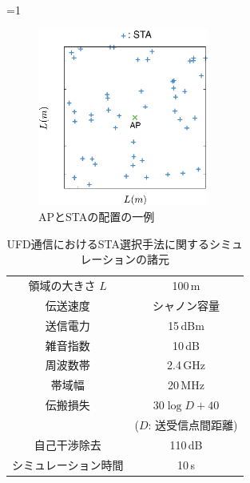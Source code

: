 \documentclass[master]{kuisthesis}		%
\newcounter{flagFig}
\begin{document}
			\ifnum\value{flagFig}=1 {\begin{figure}[t]
				\begin{center}
					\includegraphics[width=0.5\textwidth]{fig/pos.eps}
					\caption{APとSTAの配置の一例}
					\label{fig:pos}
				\end{center}
			\end{figure}}\fi

			\begin{table}[t]
				\centering
				\caption{UFD通信におけるSTA選択手法に関するシミュレーションの諸元}
				\label{tab:param}
				\begin{tabular}{cc} \hline
					領域の大きさ $L$ & 100\,m \\
					伝送速度 & シャノン容量 \\
					送信電力 & 15\,dBm \\
					雑音指数 & 10\,dB \\
					周波数帯 & 2.4\,GHz \\
					帯域幅 & 20\,MHz \\
					伝搬損失 & $30\log D + 40$\\
					&($D$: 送受信点間距離)\\
					自己干渉除去 & 110\,dB \\
					シミュレーション時間 & 10\,s \\\hline
				\end{tabular}
			\end{table}
\end{document}
